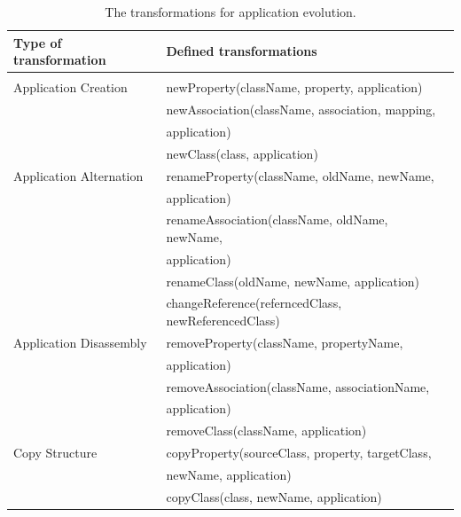 \documentclass[runningheads]{comsis}
\begin{document}
\begin{table}
\caption{The transformations for application evolution.}
	\label{tab:app-evolution}
\centering
	\begin{tabular}{ll}
	\hline
	Type of transformation & Defined transformations \\
	\hline
	\\[-2ex] 
	Application Creation
	& newProperty(className, property, application) \\
	& newAssociation(className, association, mapping, \\ &  \hspace{0.5in}application) \\
	&  newClass(class, application) \\
	Application Alternation
		& renameProperty(className, oldName, newName, \\ &  \hspace{0.5in} application) \\
		& renameAssociation(className, oldName, newName, \\ &  \hspace{0.5in}application) \\
		& renameClass(oldName, newName, application)\\
		& changeReference(referncedClass, newReferencedClass) \\
	Application Disassembly 
		& removeProperty(className, propertyName,\\ &  \hspace{0.5in} application) \\
		& removeAssociation(className, associationName, \\ &  \hspace{0.5in}application) \\
		& removeClass(className, application)\\
	Copy Structure
		& copyProperty(sourceClass, property, targetClass,\\ &  \hspace{0.5in} newName, application)  \\
		& copyClass(class, newName, application) \\
	\hline
	\end{tabular}
	
\end{table}
\end{document}
